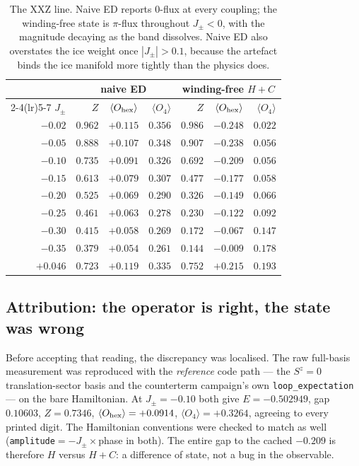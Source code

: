 \documentclass[11pt]{article}
\newcommand{\Jpm}{J_{\pm}}
\newcommand{\Ohex}{O_{\rm hex}}
\newcommand{\Ofour}{O_{4}}
\begin{document}
\begin{table}[h]
\centering
\small
\begin{tabular}{rrrrrrr}
\toprule
& \multicolumn{3}{c}{naive ED} & \multicolumn{3}{c}{winding-free $H+C$}\\
\cmidrule(lr){2-4}\cmidrule(lr){5-7}
$\Jpm$ & $Z$ & $\langle\Ohex\rangle$ & $\langle\Ofour\rangle$
       & $Z$ & $\langle\Ohex\rangle$ & $\langle\Ofour\rangle$\\
\midrule
$-0.02$ & $0.962$ & $+0.115$ & $0.356$ & $0.986$ & $-0.248$ & $0.022$\\
$-0.05$ & $0.888$ & $+0.107$ & $0.348$ & $0.907$ & $-0.238$ & $0.056$\\
$-0.10$ & $0.735$ & $+0.091$ & $0.326$ & $0.692$ & $-0.209$ & $0.056$\\
$-0.15$ & $0.613$ & $+0.079$ & $0.307$ & $0.477$ & $-0.177$ & $0.058$\\
$-0.20$ & $0.525$ & $+0.069$ & $0.290$ & $0.326$ & $-0.149$ & $0.066$\\
$-0.25$ & $0.461$ & $+0.063$ & $0.278$ & $0.230$ & $-0.122$ & $0.092$\\
$-0.30$ & $0.415$ & $+0.058$ & $0.269$ & $0.172$ & $-0.067$ & $0.147$\\
$-0.35$ & $0.379$ & $+0.054$ & $0.261$ & $0.144$ & $-0.009$ & $0.178$\\
$+0.046$ & $0.723$ & $+0.119$ & $0.335$ & $0.752$ & $+0.215$ & $0.193$\\
\bottomrule
\end{tabular}
\caption{The XXZ line.  Naive ED reports $0$-flux at every coupling; the
winding-free state is $\pi$-flux throughout $\Jpm<0$, with the magnitude
decaying as the band dissolves.  Naive ED also overstates the ice weight
once $|\Jpm|>0.1$, because the artefact binds the ice manifold more tightly
than the physics does.}
\label{tab:xxz}
\end{table}

\subsection{Attribution: the operator is right, the state was wrong}

Before accepting that reading, the discrepancy was localised.  The raw
full-basis measurement was reproduced with the \emph{reference} code path
--- the $S^z=0$ translation-sector basis and the counterterm campaign's own
\texttt{loop\_expectation} --- on the bare Hamiltonian.  At $\Jpm=-0.10$
both give $E=-0.502949$, gap $0.10603$, $Z=0.7346$,
$\langle\Ohex\rangle=+0.0914$, $\langle\Ofour\rangle=+0.3264$, agreeing to
every printed digit.  The Hamiltonian conventions were checked to match as
well (\texttt{amplitude}$=-\Jpm\times$phase in both).  The entire gap to the
cached $-0.209$ is therefore $H$ versus $H+C$: a difference of state, not a
bug in the observable.
\end{document}
